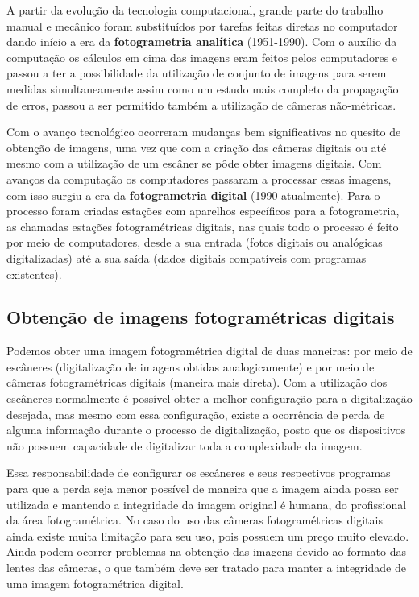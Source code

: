 A partir da evolução da tecnologia computacional, grande parte do trabalho manual e mecânico foram substituídos por tarefas feitas diretas no computador dando início a era da \textbf{fotogrametria analítica} (1951-1990). Com o auxílio da computação os cálculos em cima das imagens eram feitos pelos computadores e passou a ter a possibilidade da utilização de conjunto de imagens para serem medidas simultaneamente assim como um estudo mais completo da propagação de erros, passou a ser permitido também a utilização de câmeras não-métricas.

Com o avanço tecnológico ocorreram mudanças bem significativas no quesito de obtenção de imagens, uma vez que com a criação das câmeras digitais ou até mesmo com a utilização de um escâner se pôde obter imagens digitais. Com avanços da computação os computadores passaram a processar essas imagens, com isso surgiu a era da \textbf{fotogrametria digital} (1990-atualmente). Para o processo foram criadas estações com aparelhos específicos para a fotogrametria, as chamadas estações fotogramétricas digitais, nas quais todo o processo é feito por meio de computadores, desde a sua entrada (fotos digitais ou analógicas digitalizadas) até a sua saída (dados digitais compatíveis com programas existentes).

\subsection{Obtenção de imagens fotogramétricas digitais}
Podemos obter uma imagem fotogramétrica digital de duas maneiras: por meio de escâneres (digitalização de imagens obtidas analogicamente) e por meio de câmeras fotogramétricas digitais (maneira mais direta). Com a utilização dos escâneres normalmente é possível obter a melhor configuração para a digitalização desejada, mas mesmo com essa configuração, existe a ocorrência de perda de alguma informação durante o processo de digitalização, posto que os dispositivos não possuem capacidade de digitalizar toda a complexidade da imagem. %

Essa responsabilidade de configurar os escâneres e seus respectivos programas para que a perda seja menor possível de maneira que a imagem ainda possa ser utilizada e mantendo a integridade da imagem original é humana, do profissional da área fotogramétrica. No caso do uso das câmeras fotogramétricas digitais ainda existe muita limitação para seu uso, pois possuem um preço muito elevado. %
Ainda podem ocorrer problemas na obtenção das imagens devido ao formato das lentes das câmeras, o que também deve ser tratado para manter a integridade de uma imagem fotogramétrica digital.

